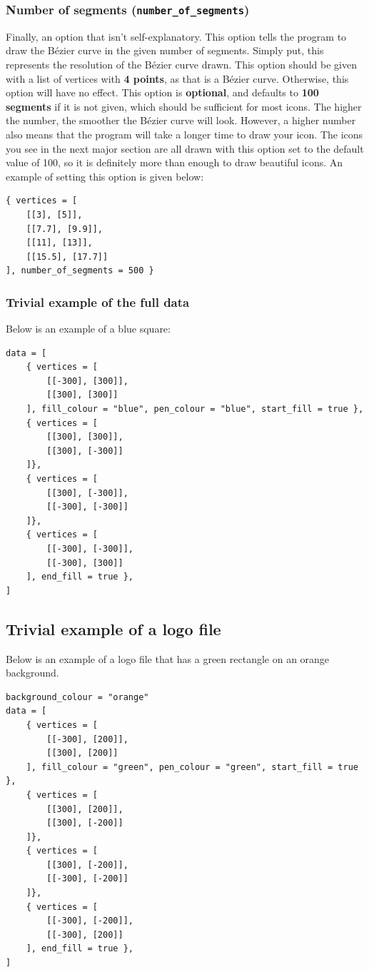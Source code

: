 \documentclass[11pt]{article}
\begin{document}
\subsubsection{Number of segments (\texttt{number\_of\_segments})}
\label{sec:orgec93c2f}
Finally, an option that isn't self-explanatory. This option tells the program to draw the Bézier curve in the given number of segments. Simply put, this represents the resolution of the Bézier curve drawn. This option should be given with a list of vertices with \textbf{4 points}, as that is a Bézier curve. Otherwise, this option will have no effect. This option is \textbf{optional}, and defaults to \textbf{100 segments} if it is not given, which should be sufficient for most icons. The higher the number, the smoother the Bézier curve will look. However, a higher number also means that the program will take a longer time to draw your icon. The icons you see in the next major section are all drawn with this option set to the default value of 100, so it is definitely more than enough to draw beautiful icons. An example of setting this option is given below:

\begin{verbatim}
{ vertices = [
    [[3], [5]],
    [[7.7], [9.9]],
    [[11], [13]],
    [[15.5], [17.7]]
], number_of_segments = 500 }
\end{verbatim}

 \newpage

\subsubsection{Trivial example of the full data}
\label{sec:orgab06b23}
Below is an example of a blue square:
\begin{verbatim}
data = [
    { vertices = [
        [[-300], [300]],
        [[300], [300]]
    ], fill_colour = "blue", pen_colour = "blue", start_fill = true },
    { vertices = [
        [[300], [300]],
        [[300], [-300]]
    ]},
    { vertices = [
        [[300], [-300]],
        [[-300], [-300]]
    ]},
    { vertices = [
        [[-300], [-300]],
        [[-300], [300]]
    ], end_fill = true },
]
\end{verbatim}

 \newpage

\subsection{Trivial example of a logo file}
\label{sec:org18ba4b0}
Below is an example of a logo file that has a green rectangle on an orange background.
\begin{verbatim}
background_colour = "orange"
data = [
    { vertices = [
        [[-300], [200]],
        [[300], [200]]
    ], fill_colour = "green", pen_colour = "green", start_fill = true },
    { vertices = [
        [[300], [200]],
        [[300], [-200]]
    ]},
    { vertices = [
        [[300], [-200]],
        [[-300], [-200]]
    ]},
    { vertices = [
        [[-300], [-200]],
        [[-300], [200]]
    ], end_fill = true },
]
\end{verbatim}
\end{document}
